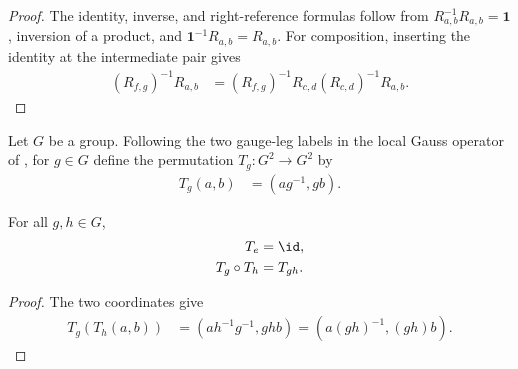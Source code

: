 \begin{proof}\leanok
    The identity, inverse, and right-reference formulas follow from
    $R_{a,b}^{-1}R_{a,b}=\mathbf 1$, inversion of a product, and
    $\mathbf 1^{-1}R_{a,b}=R_{a,b}$. For composition, inserting the identity at
    the intermediate pair gives
    \begin{align}
        (R_{f,g})^{-1}R_{a,b}
         & =(R_{f,g})^{-1}R_{c,d}(R_{c,d})^{-1}R_{a,b}.
    \end{align}
\end{proof}

\begin{definition}
    \label{def:mpug_gauss_leg_action}
    \leanok
    Let $G$ be a group. Following the two gauge-leg labels in the local Gauss
    operator of \cite[lines~3380--3387]{FrancoRubio2025MPUGauging}, for
    $g\in G$ define the permutation $T_g\colon G^2\to G^2$ by
    \begin{align}
        T_g(a,b) & =\left(ag^{-1},gb\right).
        \label{eq:mpug_gauss_leg_action}
    \end{align}
\end{definition}

\begin{lemma}
    \label{thm:mpug_gauss_leg_action_mul}
    \leanok
    For all $g,h\in G$,
    \begin{align}
        T_e          & =\id,    \\
        T_g\circ T_h & =T_{gh}.
        \label{eq:mpug_gauss_leg_action_mul}
    \end{align}
\end{lemma}

\begin{proof}\leanok
    The two coordinates give
    \begin{align}
        T_g(T_h(a,b))
         & =\left(ah^{-1}g^{-1},ghb\right)
        =\left(a(gh)^{-1},(gh)b\right).
    \end{align}
\end{proof}

